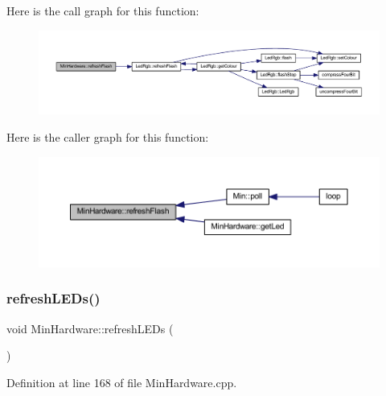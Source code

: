 Here is the call graph for this function\+:
\nopagebreak
\begin{figure}[H]
\begin{center}
\leavevmode
\includegraphics[width=350pt]{d0/d93/class_min_hardware_a22017d021942bf72850a338b1522d5c2_cgraph}
\end{center}
\end{figure}
Here is the caller graph for this function\+:
\nopagebreak
\begin{figure}[H]
\begin{center}
\leavevmode
\includegraphics[width=350pt]{d0/d93/class_min_hardware_a22017d021942bf72850a338b1522d5c2_icgraph}
\end{center}
\end{figure}
\mbox{\label{class_min_hardware_a84e0d11e73681ef8b7a7e90628b827ab}} 
\subsubsection{\texorpdfstring{refresh\+L\+E\+Ds()}{refreshLEDs()}}
{\footnotesize\ttfamily void Min\+Hardware\+::refresh\+L\+E\+Ds (\begin{DoxyParamCaption}{ }\end{DoxyParamCaption})}



Definition at line 168 of file Min\+Hardware.\+cpp.

